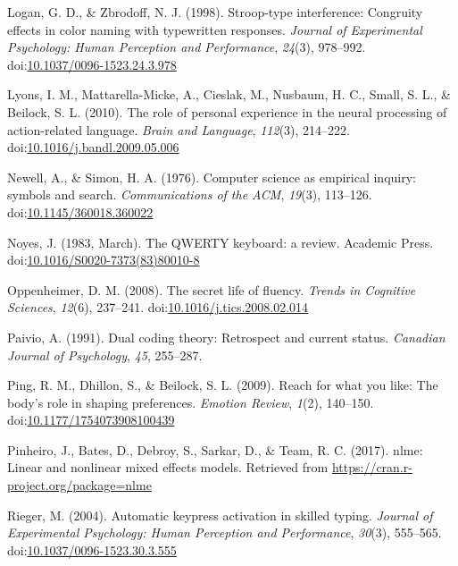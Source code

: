 \documentclass[english,man]{apa6}
\theoremstyle{definition}
\theoremstyle{definition}
\theoremstyle{definition}
\theoremstyle{remark}
\begin{document}
\hypertarget{ref-Logan1998}{}
Logan, G. D., \& Zbrodoff, N. J. (1998). Stroop-type interference:
Congruity effects in color naming with typewritten responses.
\emph{Journal of Experimental Psychology: Human Perception and
Performance}, \emph{24}(3), 978--992.
doi:\href{https://doi.org/10.1037/0096-1523.24.3.978}{10.1037/0096-1523.24.3.978}

\hypertarget{ref-Lyons2010}{}
Lyons, I. M., Mattarella-Micke, A., Cieslak, M., Nusbaum, H. C., Small,
S. L., \& Beilock, S. L. (2010). The role of personal experience in the
neural processing of action-related language. \emph{Brain and Language},
\emph{112}(3), 214--222.
doi:\href{https://doi.org/10.1016/j.bandl.2009.05.006}{10.1016/j.bandl.2009.05.006}

\hypertarget{ref-Newell1976}{}
Newell, A., \& Simon, H. A. (1976). Computer science as empirical
inquiry: symbols and search. \emph{Communications of the ACM},
\emph{19}(3), 113--126.
doi:\href{https://doi.org/10.1145/360018.360022}{10.1145/360018.360022}

\hypertarget{ref-Noyes1983}{}
Noyes, J. (1983, March). The QWERTY keyboard: a review. Academic Press.
doi:\href{https://doi.org/10.1016/S0020-7373(83)80010-8}{10.1016/S0020-7373(83)80010-8}

\hypertarget{ref-Oppenheimer2008}{}
Oppenheimer, D. M. (2008). The secret life of fluency. \emph{Trends in
Cognitive Sciences}, \emph{12}(6), 237--241.
doi:\href{https://doi.org/10.1016/j.tics.2008.02.014}{10.1016/j.tics.2008.02.014}

\hypertarget{ref-Paivio1991}{}
Paivio, A. (1991). Dual coding theory: Retrospect and current status.
\emph{Canadian Journal of Psychology}, \emph{45}, 255--287.

\hypertarget{ref-Ping2009}{}
Ping, R. M., Dhillon, S., \& Beilock, S. L. (2009). Reach for what you
like: The body's role in shaping preferences. \emph{Emotion Review},
\emph{1}(2), 140--150.
doi:\href{https://doi.org/10.1177/1754073908100439}{10.1177/1754073908100439}

\hypertarget{ref-Pinheiro2017}{}
Pinheiro, J., Bates, D., Debroy, S., Sarkar, D., \& Team, R. C. (2017).
nlme: Linear and nonlinear mixed effects models. Retrieved from
\url{https://cran.r-project.org/package=nlme}

\hypertarget{ref-Rieger2004}{}
Rieger, M. (2004). Automatic keypress activation in skilled typing.
\emph{Journal of Experimental Psychology: Human Perception and
Performance}, \emph{30}(3), 555--565.
doi:\href{https://doi.org/10.1037/0096-1523.30.3.555}{10.1037/0096-1523.30.3.555}
\end{document}
